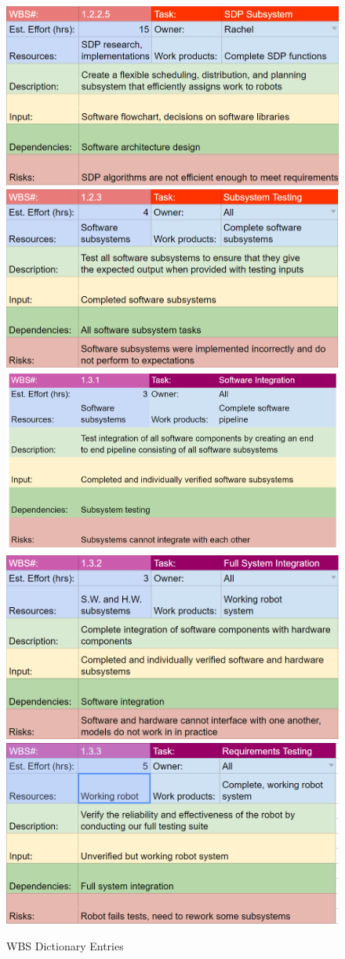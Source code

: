 \begin{figure}[h!]
\includegraphics[width=0.49\columnwidth]{wbs_schedule/wbs_dict_sw6.PNG}
\includegraphics[width=0.49\columnwidth]{wbs_schedule/wbs_dict_sw7.PNG}
\includegraphics[width=0.49\columnwidth]{wbs_schedule/wbs_dict_int1.PNG}
\includegraphics[width=0.49\columnwidth]{wbs_schedule/wbs_dict_int2.PNG}
\includegraphics[width=0.49\columnwidth]{wbs_schedule/wbs_dict_int3.PNG}
\caption{WBS Dictionary Entries}
\label{fig:wbsdict}
\end{figure}
